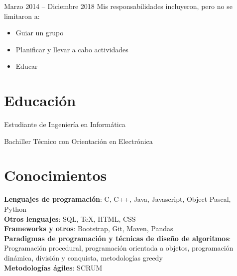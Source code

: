 \documentclass{resume}
\begin{document}
 {Marzo 2014 -- Diciembre 2018}
Mis responsabilidades incluyeron, pero no se limitaron a:
\begin{itemize}
    \item Guiar un grupo
    \item Planificar y llevar a cabo actividades
    \item Educar
\end{itemize}

\section{Educación}

Estudiante de Ingeniería en Informática

Bachiller Técnico con Orientación en Electrónica

\section{Conocimientos}
\smallskip
\textbf{Lenguajes de programación}: C, C++, Java, Javascript, Object Pascal, Python \\
\textbf{Otros lenguajes}: SQL, TeX, HTML, CSS \\
\textbf{Frameworks y otros}: Bootstrap, Git, Maven, Pandas \\
\textbf{Paradigmas de programación y técnicas de diseño de algoritmos}: Programación procedural, programación orientada a objetos, programación dinámica, división y conquista, metodologías greedy \\
\textbf{Metodologías ágiles}: SCRUM \\
\end{document}
